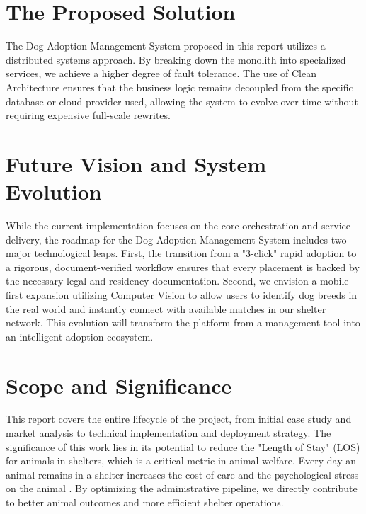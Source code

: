\section{The Proposed Solution}
The Dog Adoption Management System proposed in this report utilizes a distributed systems approach. By breaking down the monolith into specialized services, we achieve a higher degree of fault tolerance. The use of Clean Architecture \cite{clean_architecture} ensures that the business logic remains decoupled from the specific database or cloud provider used, allowing the system to evolve over time without requiring expensive full-scale rewrites.

\section{Future Vision and System Evolution}
While the current implementation focuses on the core orchestration and service delivery, the roadmap for the Dog Adoption Management System includes two major technological leaps. First, the transition from a "3-click" rapid adoption to a rigorous, document-verified workflow ensures that every placement is backed by the necessary legal and residency documentation. Second, we envision a mobile-first expansion utilizing Computer Vision to allow users to identify dog breeds in the real world and instantly connect with available matches in our shelter network. This evolution will transform the platform from a management tool into an intelligent adoption ecosystem.

\section{Scope and Significance}
This report covers the entire lifecycle of the project, from initial case study and market analysis to technical implementation and deployment strategy. The significance of this work lies in its potential to reduce the "Length of Stay" (LOS) for animals in shelters, which is a critical metric in animal welfare. Every day an animal remains in a shelter increases the cost of care and the psychological stress on the animal \cite{shelter_stress_2022}. By optimizing the administrative pipeline, we directly contribute to better animal outcomes and more efficient shelter operations.
